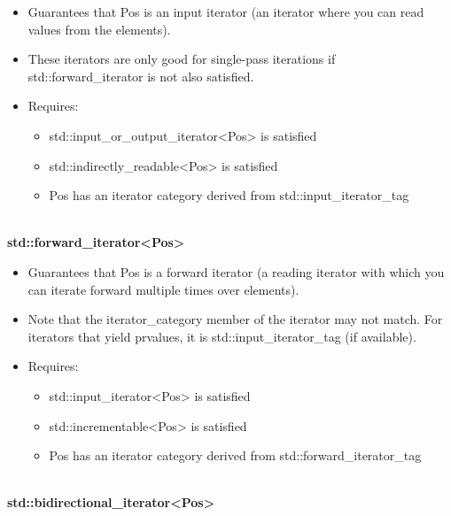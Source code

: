 \begin{itemize}
\item
Guarantees that Pos is an input iterator (an iterator where you can read values from the elements).

\item
These iterators are only good for single-pass iterations if std::forward\_iterator is not also satisfied.

\item
Requires:
\begin{itemize}
\item
std::input\_or\_output\_iterator<Pos> is satisfied

\item
std::indirectly\_readable<Pos> is satisfied

\item
Pos has an iterator category derived from std::input\_iterator\_tag
\end{itemize}
\end{itemize}


\noindent
\hspace*{\fill} \\ %
\textbf{std::forward\_iterator<Pos>}

\begin{itemize}
\item
Guarantees that Pos is a forward iterator (a reading iterator with which you can iterate forward multiple times over elements).

\item
Note that the iterator\_category member of the iterator may not match. For iterators that yield prvalues, it is std::input\_iterator\_tag (if available).

\item
Requires:
\begin{itemize}
\item
std::input\_iterator<Pos> is satisfied

\item
std::incrementable<Pos> is satisfied

\item
Pos has an iterator category derived from std::forward\_iterator\_tag
\end{itemize}
\end{itemize}

\noindent
\hspace*{\fill} \\ %
\textbf{std::bidirectional\_iterator<Pos>}

